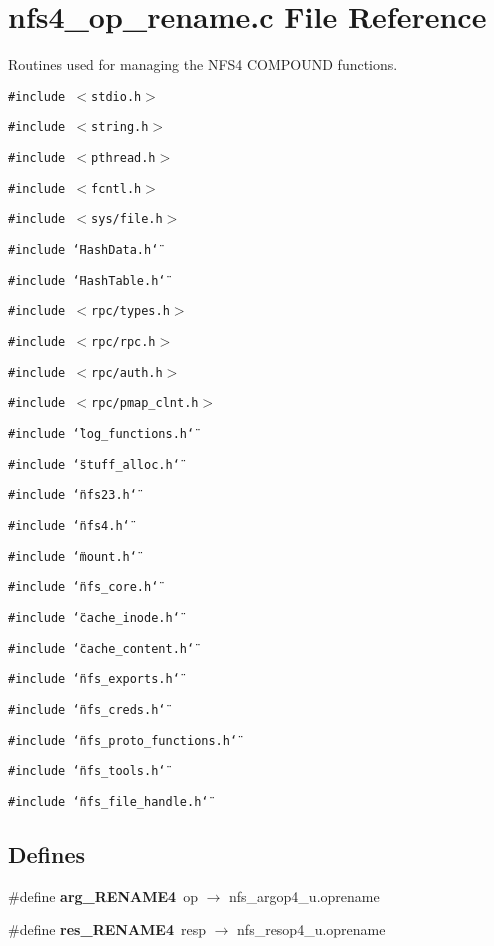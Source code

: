 \section{nfs4\_\-op\_\-rename.c File Reference}
\label{nfs4__op__rename_8c}
Routines used for managing the NFS4 COMPOUND functions. 

{\tt \#include $<$stdio.h$>$}\par
{\tt \#include $<$string.h$>$}\par
{\tt \#include $<$pthread.h$>$}\par
{\tt \#include $<$fcntl.h$>$}\par
{\tt \#include $<$sys/file.h$>$}\par
{\tt \#include \char`\"{}Hash\-Data.h\char`\"{}}\par
{\tt \#include \char`\"{}Hash\-Table.h\char`\"{}}\par
{\tt \#include $<$rpc/types.h$>$}\par
{\tt \#include $<$rpc/rpc.h$>$}\par
{\tt \#include $<$rpc/auth.h$>$}\par
{\tt \#include $<$rpc/pmap\_\-clnt.h$>$}\par
{\tt \#include \char`\"{}log\_\-functions.h\char`\"{}}\par
{\tt \#include \char`\"{}stuff\_\-alloc.h\char`\"{}}\par
{\tt \#include \char`\"{}nfs23.h\char`\"{}}\par
{\tt \#include \char`\"{}nfs4.h\char`\"{}}\par
{\tt \#include \char`\"{}mount.h\char`\"{}}\par
{\tt \#include \char`\"{}nfs\_\-core.h\char`\"{}}\par
{\tt \#include \char`\"{}cache\_\-inode.h\char`\"{}}\par
{\tt \#include \char`\"{}cache\_\-content.h\char`\"{}}\par
{\tt \#include \char`\"{}nfs\_\-exports.h\char`\"{}}\par
{\tt \#include \char`\"{}nfs\_\-creds.h\char`\"{}}\par
{\tt \#include \char`\"{}nfs\_\-proto\_\-functions.h\char`\"{}}\par
{\tt \#include \char`\"{}nfs\_\-tools.h\char`\"{}}\par
{\tt \#include \char`\"{}nfs\_\-file\_\-handle.h\char`\"{}}\par
\subsection*{Defines}
\begin{CompactItemize}
\item 
\#define {\bf arg\_\-RENAME4}\ op $\rightarrow$ nfs\_\-argop4\_\-u.oprename
\item 
\#define {\bf res\_\-RENAME4}\ resp $\rightarrow$ nfs\_\-resop4\_\-u.oprename
\end{CompactItemize}
